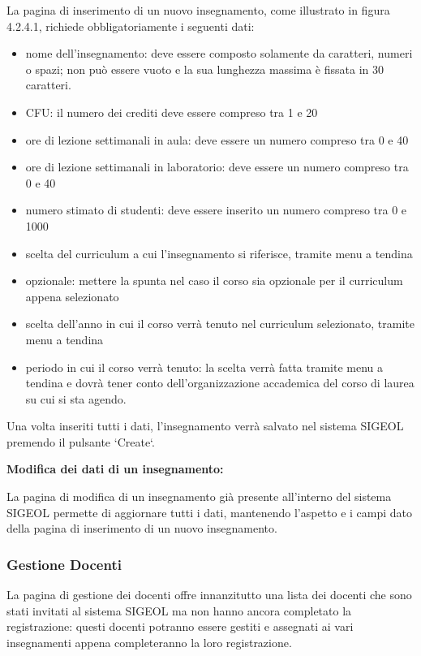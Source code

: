 \documentclass[11pt,a4paper]{article}
\begin{document}
La pagina di inserimento di un nuovo insegnamento, come illustrato in figura 4.2.4.1, richiede obbligatoriamente i seguenti dati:
\begin{itemize}
 \item nome dell'insegnamento: deve essere composto solamente da caratteri, numeri o spazi; non può essere vuoto e la sua lunghezza massima è fissata in 30 caratteri.
 \item CFU: il numero dei crediti deve essere compreso tra 1 e 20
 \item ore di lezione settimanali in aula: deve essere un numero compreso tra 0 e 40
 \item ore di lezione settimanali in laboratorio: deve essere un numero compreso tra 0 e 40
 \item numero stimato di studenti: deve essere inserito un numero compreso tra 0 e 1000
 \item scelta del curriculum a cui l'insegnamento si riferisce, tramite menu a tendina
 \item opzionale: mettere la spunta nel caso il corso sia opzionale per il curriculum appena selezionato
 \item scelta dell'anno in cui il corso verrà tenuto nel curriculum selezionato, tramite menu a tendina
 \item periodo in cui il corso verrà tenuto: la scelta verrà fatta tramite menu a tendina e dovrà tener conto dell'organizzazione accademica del corso di laurea su cui si sta agendo.
\end{itemize}
Una volta inseriti tutti i dati, l'insegnamento verrà salvato nel sistema SIGEOL premendo il pulsante `Create`.
\newline \newline
\begin{large}\textbf{Modifica dei dati di un insegnamento:}\end{large}
La pagina di modifica di un insegnamento già presente all'interno del sistema SIGEOL permette di aggiornare tutti i dati, mantenendo l'aspetto e i campi dato della pagina di inserimento di un nuovo insegnamento.
\subsubsection{Gestione Docenti}
La pagina di gestione dei docenti offre innanzitutto una lista dei docenti che sono stati invitati al sistema SIGEOL ma non hanno ancora completato la registrazione: questi docenti potranno essere gestiti e assegnati ai vari insegnamenti appena completeranno la loro registrazione.
\end{document}
